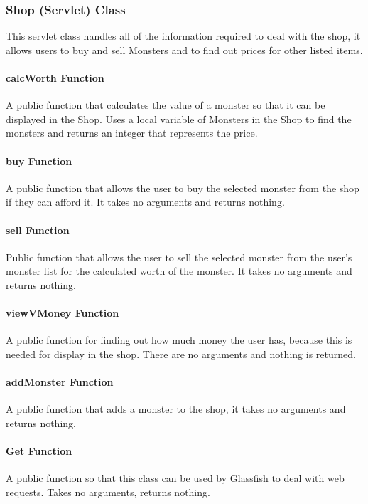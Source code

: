 \documentclass[titlepage]{article}
\begin{document}
\subsubsection{Shop (Servlet) Class}
This servlet class handles all of the information required to deal with the shop, it allows users to buy and sell Monsters and to find out prices for other listed items.

\paragraph{calcWorth Function}
A public function that calculates the value of a monster so that it can be displayed in the Shop. Uses a local variable of Monsters in the Shop to find the monsters and returns an integer that represents the price.

\paragraph{buy Function}
A public function that allows the user to buy the selected monster from the shop if they can afford it. It takes no arguments and returns nothing.

\paragraph{sell Function}
Public function that allows the user to sell the selected monster from the user's monster list for the calculated worth of the monster. It takes no arguments and returns nothing.

\paragraph{viewVMoney Function}
A public function for finding out how much money the user has, because this is needed for display in the shop. There are no arguments and nothing is returned.

\paragraph{addMonster Function}
A public function that adds a monster to the shop, it takes no arguments and returns nothing.

\paragraph{Get Function}
A public function so that this class can be used by Glassfish to deal with web requests. Takes no arguments, returns nothing.
\end{document}
